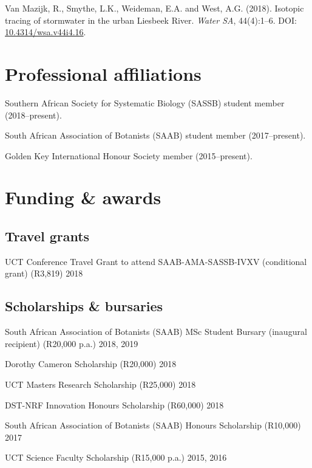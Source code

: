 \documentclass[]{article}
\begin{document}
Van Mazijk, R., Smythe, L.K., Weideman, E.A. and West, A.G. (2018).
Isotopic tracing of stormwater in the urban Liesbeek River. \emph{Water
SA}, 44(4):1--6. DOI:
\href{http://dx.doi.org/10.4314/wsa.v44i4.16}{10.4314/wsa.v44i4.16}.

\hypertarget{professional-affiliations}{%
\section{Professional affiliations}\label{professional-affiliations}}

Southern African Society for Systematic Biology (SASSB) student member
(2018--present).

South African Association of Botanists (SAAB) student member
(2017--present).

Golden Key International Honour Society member (2015--present).

\hypertarget{funding-awards}{%
\section{Funding \& awards}\label{funding-awards}}

\hypertarget{travel-grants}{%
\subsection{Travel grants}\label{travel-grants}}

UCT Conference Travel Grant to attend SAAB-AMA-SASSB-IVXV (conditional
grant) (R3,819) \hfill 2018

\hypertarget{scholarships-bursaries}{%
\subsection{Scholarships \& bursaries}\label{scholarships-bursaries}}

South African Association of Botanists (SAAB) MSc Student Bursary
(inaugural recipient) (R20,000 p.a.) \hfill 2018, 2019

Dorothy Cameron Scholarship (R20,000) \hfill 2018

UCT Masters Research Scholarship (R25,000) \hfill 2018

DST-NRF Innovation Honours Scholarship (R60,000) \hfill 2018

South African Association of Botanists (SAAB) Honours Scholarship
(R10,000) \hfill 2017

UCT Science Faculty Scholarship (R15,000 p.a.) \hfill 2015, 2016
\end{document}
